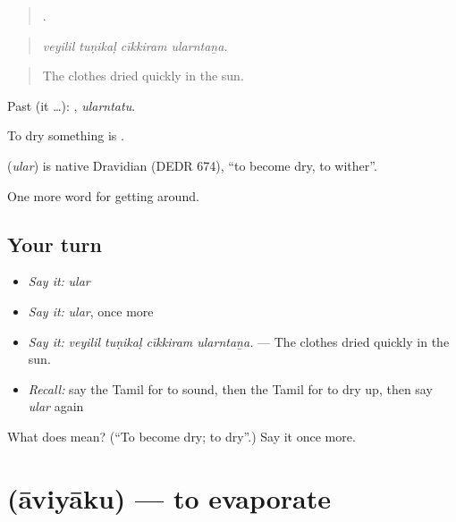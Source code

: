 \begin{quote}
   .
\end{quote}

\begin{quote}
\emph{veyilil tuṇikaḷ cīkkiram ularntaṉa.}
\end{quote}

\begin{quote}
The clothes dried quickly in the sun.
\end{quote}

Past (it …): , \emph{ularntatu}.

To dry something is .

\begin{cousinweb}
\textbf{} (\emph{ular}) is native Dravidian (DEDR 674), \textquotedblleft{}to become dry, to wither\textquotedblright{}.
\end{cousinweb}

\begin{grammarlens}[title={What you've built}]
One more word for getting around.
\end{grammarlens}

\subsection*{Your turn}
\begin{itemize}
\raggedright
  \item \emph{Say it:} \emph{ular}
  \item \emph{Say it:} \emph{ular}, once more
  \item \emph{Say it:} \emph{veyilil tuṇikaḷ cīkkiram ularntaṉa.} — The clothes dried quickly in the sun.
  \item \emph{Recall:} say the Tamil for to sound, then the Tamil for to dry up, then say \emph{ular} again
\end{itemize}

\begin{tcolorbox}[breakable,colback=teal!4,colframe=teal!35!black,title={Before you move on}]
What does  mean? (\textquotedblleft{}To become dry; to dry\textquotedblright{}.) Say it once more.
\end{tcolorbox}
\section[\texorpdfstring{\ta{ஆவியாகு} (āviyāku)}{ஆவியாகு (āviyāku)}]{ (āviyāku) — to evaporate}

